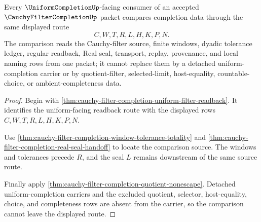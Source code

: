 \begin{theorem}
\label{thm:cauchy-filter-completion-uniform-completion-comparison}
Every $\UniformCompletionUp$-facing consumer of an accepted $\CauchyFilterCompletionUp$ packet compares completion data through the same displayed route
$$
C,W,T,R,L,H,K,P,N .
$$
The comparison reads the Cauchy-filter source, finite windows, dyadic tolerance ledger, regular readback, Real seal, transport, replay, provenance, and local naming rows from one packet; it cannot replace them by a detached uniform-completion carrier or by quotient-filter, selected-limit, host-equality, countable-choice, or ambient-completeness data.
\end{theorem}
\begin{proof}
Begin with \autoref{thm:cauchy-filter-completion-uniform-filter-readback}. It identifies the uniform-facing readback route with the displayed rows $C,W,T,R,L,H,K,P,N$.

Use \autoref{thm:cauchy-filter-completion-window-tolerance-totality} and \autoref{thm:cauchy-filter-completion-real-seal-handoff} to locate the comparison source. The windows and tolerances precede $R$, and the seal $L$ remains downstream of the same source route.

Finally apply \autoref{thm:cauchy-filter-completion-quotient-nonescape}. Detached uniform-completion carriers and the excluded quotient, selector, host-equality, choice, and completeness rows are absent from the carrier, so the comparison cannot leave the displayed route.
\end{proof}

